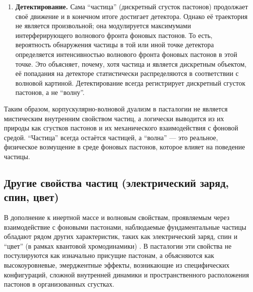 \documentclass[pdflatex,sn-mathphys-num]{sn-jnl}
\begin{document}
\begin{enumerate}
    \item \textbf{Детектирование.} Сама ``частица'' (дискретный сгусток пастонов) продолжает своё движение и в конечном итоге достигает детектора. Однако её траектория не является произвольной; она модулируется максимумами интерферирующего волнового фронта фоновых пастонов. То есть, вероятность обнаружения частицы в той или иной точке детектора определяется интенсивностью волнового фронта фоновых пастонов в этой точке. Это объясняет, почему, хотя частица и является дискретным объектом, её попадания на детекторе статистически распределяются в соответствии с волновой картиной. Детектирование всегда регистрирует дискретный сгусток пастонов, а не ``волну''.
\end{enumerate}

Таким образом, корпускулярно-волновой дуализм в пасталогии не является мистическим внутренним свойством частиц, а логически выводится из их природы как сгустков пастонов и их механического взаимодействия с фоновой средой. ``Частица'' всегда остаётся частицей, а ``волна'' --- это реальное, физическое возмущение в среде фоновых пастонов, которое влияет на поведение частицы.

\subsection{Другие свойства частиц (электрический заряд, спин, цвет)}\label{subsec:particle-properties}

В дополнение к инертной массе и волновым свойствам, проявляемым через взаимодействие с фоновыми пастонами, наблюдаемые фундаментальные частицы обладают рядом других характеристик, таких как электрический заряд, спин и ``цвет'' (в рамках квантовой хромодинамики) \cite{pdg2024}. В пасталогии эти свойства не постулируются как изначально присущие пастонам, а объясняются как высокоуровневые, эмерджентные эффекты, возникающие из специфических конфигураций, сложной внутренней динамики и пространственного расположения пастонов в организованных сгустках.
\end{document}
